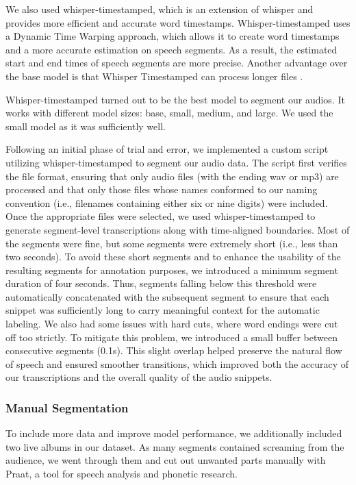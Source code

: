 \documentclass[a4paper]{article}
\begin{document}
We also used whisper-timestamped, which is an extension of whisper and provides more efficient and accurate word timestamps. Whisper-timestamped uses a Dynamic Time Warping approach, which allows it to create word timestamps and a more accurate estimation on speech segments. As a result, the estimated start and end times of speech segments are more precise. Another advantage over the base model is that Whisper Timestamped can process longer files \cite{Andreyev2025}.

Whisper-timestamped turned out to be the best model to segment our audios. It works with different model sizes: base, small, medium, and large. We used the small model as it was sufficiently well.

Following an initial phase of trial and error, we implemented a custom script utilizing whisper-timestamped to segment our audio data. The script first verifies the file format, ensuring that only audio files (with the ending wav or mp3) are processed and that only those files whose names conformed to our naming convention (i.e., filenames containing either six or nine digits) were included. Once the appropriate files were selected, we used whisper-timestamped to generate segment-level transcriptions along with time-aligned boundaries. Most of the segments were fine, but some segments were extremely short (i.e., less than two seconds). To avoid these short segments and to enhance the usability of the resulting segments for annotation purposes, we introduced a minimum segment duration of four seconds. Thus, segments falling below this threshold were automatically concatenated with the subsequent segment to ensure that each snippet was sufficiently long to carry meaningful context for the automatic labeling. We also had some issues with hard cuts, where word endings were cut off too strictly. To mitigate this problem, we introduced a small buffer between consecutive segments (0.1s). This slight overlap helped preserve the natural flow of speech and ensured smoother transitions, which improved both the accuracy of our transcriptions and the overall quality of the audio snippets.


\subsubsection{Manual Segmentation}

To include more data and improve model performance, we additionally included two live albums in our dataset. As many segments contained screaming from the audience, we went through them and cut out unwanted parts manually with Praat, a tool for speech analysis and phonetic research.
\end{document}
